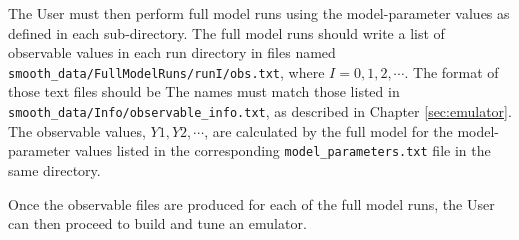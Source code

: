 \documentclass[UserManual.tex]{subfiles}
\begin{document}
The User must then perform full model runs using the model-parameter values as defined in each sub-directory. The full model runs should write a list of observable values in each run directory in files named {\tt smooth\_data/FullModelRuns/runI/obs.txt}, where $I=0,1,2,\cdots$. The format of those text files should be
\vspace*{-8pt}{\tt \begin{Verbatim}[commandchars=\\\{\}]
observable_name_1  Y1  
observable_name_2  Y2  
observable_name_3  Y3  
.
\end{Verbatim}
}\vspace*{-8pt}
The names must match those listed in {\tt smooth\_data/Info/observable\_info.txt}, as described in Chapter \ref{sec:emulator}. The observable values, $Y1,Y2,\cdots$, are calculated by the full model for the model-parameter values listed in the corresponding {\tt model\_parameters.txt} file in the same directory.

Once the observable files are produced for each of the full model runs, the User can then proceed to build and tune an emulator.
\end{document}
